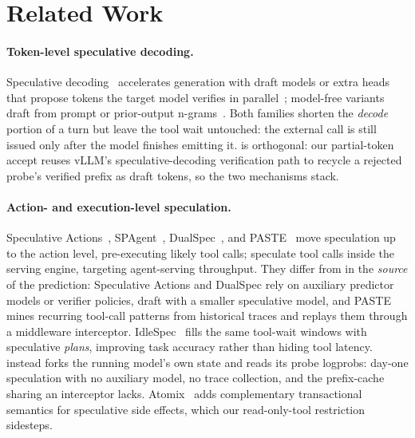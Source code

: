 \section{Related Work}
\label{sec:related}

\paragraph{Token-level speculative decoding.}
Speculative decoding~\citep{leviathan_fast_2023} accelerates generation with draft
models or extra heads that propose tokens the target model verifies in
parallel~\citep{li_eagle_2024, li_eagle2_2024, li_eagle3_2025, cai_medusa_2024,
an_pard_2025}; model-free variants draft from prompt or prior-output
n-grams~\citep{saxena_pld_2023, oliaro_suffixdecoding_2024}.
Both families shorten the \emph{decode} portion of a turn but leave the tool wait
untouched: the external call is still issued only after the model finishes emitting it.
\spork{} is orthogonal: our partial-token accept reuses vLLM's
speculative-decoding verification path to recycle a rejected probe's verified prefix as
draft tokens, so the two mechanisms stack.

\paragraph{Action- and execution-level speculation.}
Speculative Actions~\citep{ye_speculative_2026}, SPAgent~\citep{huang_reducing_2025},
DualSpec~\citep{zhong_dualspec_2026}, and PASTE~\citep{sui_act_2026} move speculation up to
the action level, pre-executing likely tool calls; \citet{nichols_optimizing_2025}
speculate tool calls inside the serving engine, targeting agent-serving throughput.
They differ from \spork{} in the \emph{source} of the prediction: Speculative Actions and
DualSpec rely on auxiliary predictor models or verifier policies,
\citet{nichols_optimizing_2025} draft with a smaller speculative model, and PASTE
mines recurring tool-call patterns from historical traces and replays them through a
middleware interceptor.
IdleSpec~\citep{choi_idlespec_2026} fills the same tool-wait windows with speculative
\emph{plans}, improving task accuracy rather than hiding tool latency.
\spork{} instead forks the running model's own state and reads its probe logprobs:
day-one speculation with no auxiliary model, no trace collection, and the prefix-cache
sharing an interceptor lacks.
Atomix~\citep{mohammadi_atomix_2026} adds complementary transactional semantics for
speculative side effects, which our read-only-tool restriction sidesteps.

